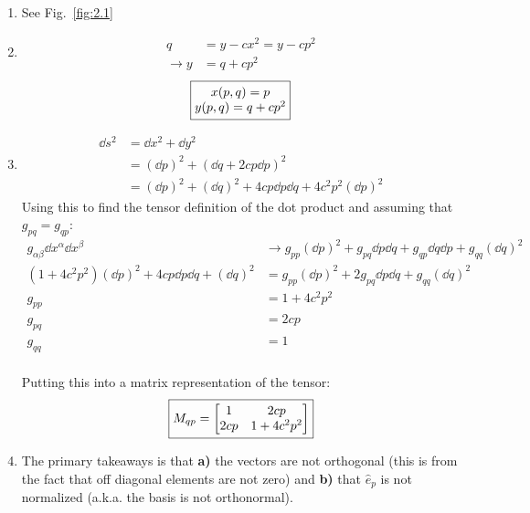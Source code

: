 \documentclass[11pt]{article}
\begin{document}
\begin{enumerate}[label=\alph*)]
\item See Fig.~\ref{fig:2.1}
\item 
\begin{align*}
q &= y -cx^2 = y-cp^2 \\
\rightarrow y &= q+ cp^2
\end{align*}
\[\boxed{\mqty{x(p,q) = p \\ y(p,q) = q + cp^2}}\]
\item 
\begin{align*}
\dd{s^2} & = \dd{x^2} + \dd{y^2}\\
&= \left(\dd{p}\right)^2 + \left(\dd{q} + 2cp \dd{p}\right)^2\\
&= \left(\dd{p}\right)^2 + \left(\dd{q}\right)^2 + 4cp\dd{p}\dd{q} + 4c^2 p^2 \left(\dd{p}\right)^2
\end{align*}
Using this to find the tensor definition of the dot product and assuming that $g_{pq} = g_{qp}$:
\begin{align*}
g_{\alpha \beta} \dd{x}^\alpha \dd{x}^\beta & \rightarrow g_{pp}\left(\dd{p}\right)^2 + g_{pq}\dd{p}\dd{q} + g_{qp} \dd{q} \dd{p} + g_{qq} \left(\dd{q}\right)^2\\
\left(1 + 4c^2p^2\right)\left(\dd{p}\right)^2 + 4cp\dd{p}\dd{q} + \left(\dd{q}\right)^2 & = g_{pp}\left(\dd{p}\right)^2 + 2g_{pq}\dd{p}\dd{q} + g_{qq} \left(\dd{q}\right)^2\\
g_{pp} & = 1 + 4c^2p^2\\
g_{pq} & = 2cp\\
g_{qq} & = 1 \\
\end{align*}
 
Putting this into a matrix representation of the tensor:
\[\boxed{M_{qp} = \mqty[1 & 2cp \\ 2cp & 1+4c^2p^2]}\]

\item
The primary takeaways is that {\bf a)} the vectors are not orthogonal (this is from the fact that off diagonal elements are not zero) and {\bf b)} that $\hat{e}_p$ is not normalized (a.k.a. the basis is not orthonormal).

\end{enumerate}
\end{document}

